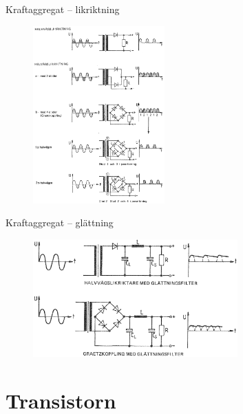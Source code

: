 \documentclass{beamer}
\begin{document}
\begin{frame}{Kraftaggregat -- likriktning}

\begin{figure}[h]
\includegraphics[width=0.45\textwidth]{images/cropped_pdfs/bild_2_3-35.pdf}
\label{fig:BildII1-16}
\end{figure}
\end{frame}

\begin{frame}{Kraftaggregat -- glättning}

\begin{figure}[h]
\includegraphics[width=0.7\textwidth]{images/cropped_pdfs/bild_2_3-36.pdf}
\label{fig:BildII1-16}
\end{figure}
\end{frame}

\section{Transistorn}
\end{document}
